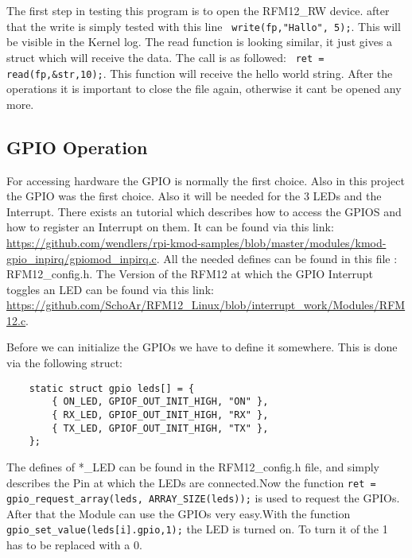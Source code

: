 The first step in testing this program is to open the RFM12\_RW device. after that the write is simply tested with this line \verb| write(fp,"Hallo", 5);|. This will be visible in the Kernel log. The read function is looking similar, it just gives a struct which will receive the data. The call is as followed: \verb| ret = read(fp,&str,10);|. This function will receive the hello world string. After the operations it is important to close the file again, otherwise it cant be opened any more. 

\subsection{GPIO Operation}

For accessing hardware the GPIO is normally the first choice. Also in this project the GPIO was the first choice. Also it will be needed for the 3 LEDs and the Interrupt. There exists an tutorial which describes how to access the GPIOS and how to register an Interrupt on them. It can be found via this link: \url{https://github.com/wendlers/rpi-kmod-samples/blob/master/modules/kmod-gpio_inpirq/gpiomod_inpirq.c}. All the needed defines can be found in this file : RFM12\_config.h.\newline
The Version of the RFM12 at which the GPIO Interrupt toggles an LED can be found via this link: \url{https://github.com/SchoAr/RFM12_Linux/blob/interrupt_work/Modules/RFM12.c}.\newline

Before we can initialize the GPIOs we have to define it somewhere. This is done via the following struct: 

\begin{lstlisting}
	static struct gpio leds[] = {
		{ ON_LED, GPIOF_OUT_INIT_HIGH, "ON" },
		{ RX_LED, GPIOF_OUT_INIT_HIGH, "RX" },
		{ TX_LED, GPIOF_OUT_INIT_HIGH, "TX" },
	};                                                                                                                
\end{lstlisting}

The defines of *\_LED can be found in the RFM12\_config.h file, and simply describes the Pin at which the LEDs are connected.\newline Now the function \verb|ret = gpio_request_array(leds, ARRAY_SIZE(leds));| is used to request the GPIOs. After that the Module can use the GPIOs very easy.\newline With the function \verb|gpio_set_value(leds[i].gpio,1);| the LED is turned on. To turn it of the 1 has to be replaced with a 0.\newline 

